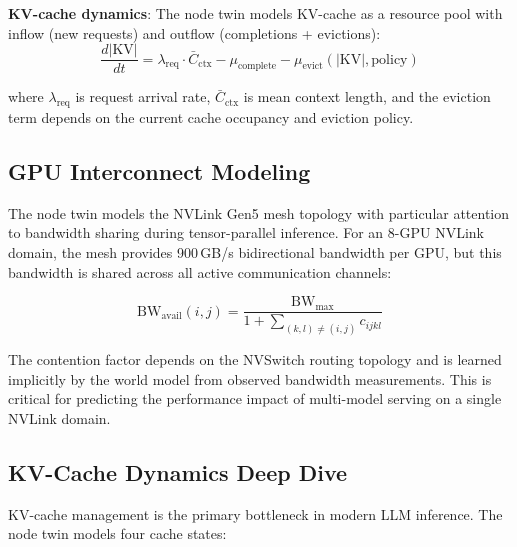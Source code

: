 \documentclass[conference,10pt]{IEEEtran}
\begin{document}
\textbf{KV-cache dynamics}: The node twin models KV-cache as a resource pool with inflow (new requests) and outflow (completions + evictions):
\begin{equation}
\frac{d|\text{KV}|}{dt} = \lambda_{\text{req}} \cdot \bar{C}_{\text{ctx}} - \mu_{\text{complete}} - \mu_{\text{evict}}(|\text{KV}|, \text{policy})
\end{equation}

where $\lambda_{\text{req}}$ is request arrival rate, $\bar{C}_{\text{ctx}}$ is mean context length, and the eviction term depends on the current cache occupancy and eviction policy.


\subsection{GPU Interconnect Modeling}

The node twin models the NVLink Gen5 mesh topology with particular attention to bandwidth sharing during tensor-parallel inference. For an 8-GPU NVLink domain, the mesh provides 900\,GB/s bidirectional bandwidth per GPU, but this bandwidth is shared across all active communication channels:

\begin{equation}
\text{BW}_{\text{avail}}(i,j) = \frac{\text{BW}_{\max}}{1 + \textstyle\sum_{(k,l) \neq (i,j)} c_{ijkl}}
\end{equation}

The contention factor depends on the NVSwitch routing topology and is learned implicitly by the world model from observed bandwidth measurements. This is critical for predicting the performance impact of multi-model serving on a single NVLink domain.

\subsection{KV-Cache Dynamics Deep Dive}

KV-cache management is the primary bottleneck in modern LLM inference. The node twin models four cache states:

\begin{table}[!htbp]
\caption{KV-Cache State Transitions}
\label{tab:kvstates}
\centering\scriptsize
{}
\end{table}
\end{document}

